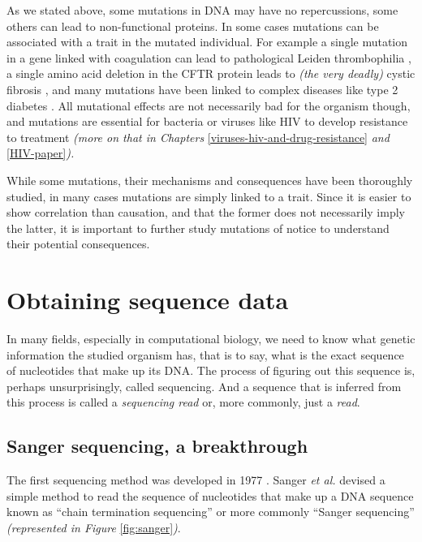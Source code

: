 \documentclass[
  11pt,
  twoside]{scrbook}
\begin{document}
As we stated above, some mutations in DNA may have no repercussions, some others can lead to non-functional proteins. In some cases mutations can be associated with a trait in the mutated individual. For example a single mutation in a gene linked with coagulation can lead to pathological Leiden thrombophilia \autocite{kujovichFactorLeidenThrombophilia2011}, a single amino acid deletion in the CFTR protein leads to \emph{(the very deadly)} cystic fibrosis \autocite{cuttingCysticFibrosisGenetics2015}, and many mutations have been linked to complex diseases like type 2 diabetes \autocite{fuchsbergerGeneticArchitectureType2016,morrisLargescaleAssociationAnalysis2012}. All mutational effects are not necessarily bad for the organism though, and mutations are essential for bacteria \autocite{woodfordEmergenceAntibioticResistance2007} or viruses like HIV \autocite{rheeHumanImmunodeficiencyVirus2003} to develop resistance to treatment \emph{(more on that in Chapters} \ref{viruses-hiv-and-drug-resistance} \emph{and} \ref{HIV-paper}\emph{).}

While some mutations, their mechanisms and consequences have been thoroughly studied, in many cases mutations are simply linked to a trait. Since it is easier to show correlation than causation, and that the former does not necessarily imply the latter, it is important to further study mutations of notice to understand their potential consequences.

\hypertarget{obtaining-sequence-data}{%
\section{Obtaining sequence data}\label{obtaining-sequence-data}}

In many fields, especially in computational biology, we need to know what genetic information the studied organism has, that is to say, what is the exact sequence of nucleotides that make up its DNA. The process of figuring out this sequence is, perhaps unsurprisingly, called sequencing. And a sequence that is inferred from this process is called a \emph{sequencing read} or, more commonly, just a \emph{read}.

\hypertarget{sanger-sequencing-a-breakthrough}{%
\subsection{Sanger sequencing, a breakthrough}\label{sanger-sequencing-a-breakthrough}}

The first sequencing method was developed in 1977 \autocite{sangerDNASequencingChainterminating1977}. Sanger \emph{et al.} devised a simple method to read the sequence of nucleotides that make up a DNA sequence known as ``chain termination sequencing'' or more commonly ``Sanger sequencing'' \emph{(represented in Figure} \ref{fig:sanger}\emph{)}.
\end{document}
